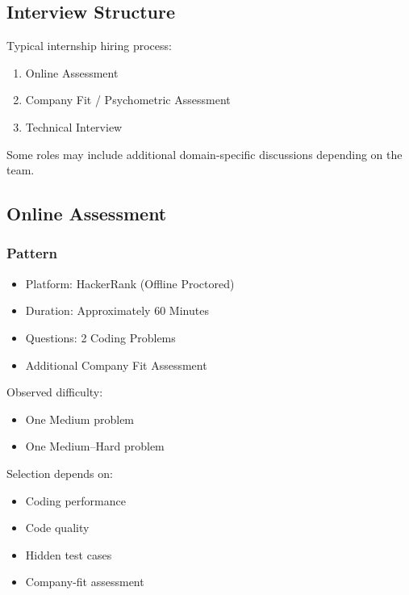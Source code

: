 \documentclass[11pt,a4paper]{article}
\begin{document}

\subsection{Interview Structure}

Typical internship hiring process:

\begin{enumerate}
	\item Online Assessment
	\item Company Fit / Psychometric Assessment
	\item Technical Interview
\end{enumerate}

Some roles may include additional domain-specific discussions depending on the team.


\subsection{Online Assessment}

\subsubsection{Pattern}

\begin{itemize}
	\item Platform: HackerRank (Offline Proctored)
	\item Duration: Approximately 60 Minutes
	\item Questions: 2 Coding Problems
	\item Additional Company Fit Assessment
\end{itemize}

Observed difficulty:

\begin{itemize}
	\item One Medium problem
	\item One Medium--Hard problem
\end{itemize}

Selection depends on:

\begin{itemize}
	\item Coding performance
	\item Code quality
	\item Hidden test cases
	\item Company-fit assessment
\end{itemize}
\end{document}
